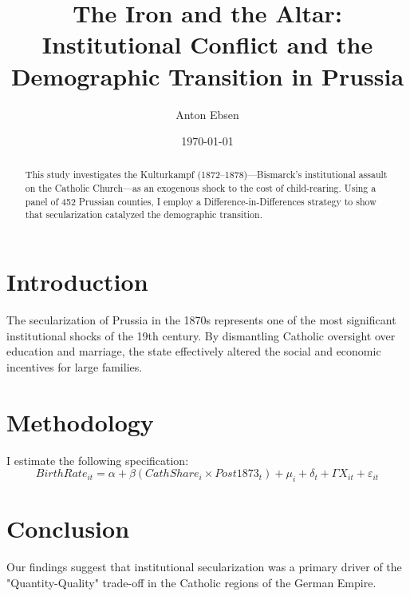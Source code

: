 \documentclass[12pt,a4paper]{article}
\title{The Iron and the Altar: \\ Institutional Conflict and the Demographic Transition in Prussia}
\author{Anton Ebsen}
\date{\today}
\begin{document}
\maketitle

\begin{abstract}
This study investigates the Kulturkampf (1872--1878)---Bismarck’s institutional assault on the Catholic Church---as an exogenous shock to the cost of child-rearing. Using a panel of 452 Prussian counties, I employ a Difference-in-Differences strategy to show that secularization catalyzed the demographic transition.
\end{abstract}

\section{Introduction}
The secularization of Prussia in the 1870s represents one of the most significant institutional shocks of the 19th century. By dismantling Catholic oversight over education and marriage, the state effectively altered the social and economic incentives for large families.

\section{Methodology}
I estimate the following specification:
\begin{equation}
    BirthRate_{it} = \alpha + \beta(CathShare_i \times Post1873_t) + \mu_i + \delta_t + \Gamma X_{it} + \varepsilon_{it}
\end{equation}

\section{Conclusion}
Our findings suggest that institutional secularization was a primary driver of the "Quantity-Quality" trade-off in the Catholic regions of the German Empire.
\end{document}
